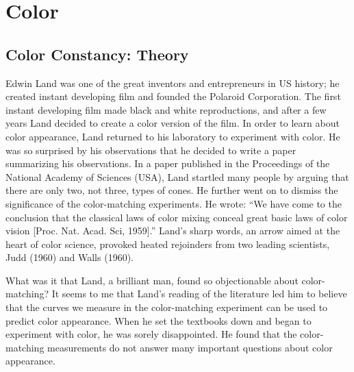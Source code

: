 \chapter{Color}
\label{chapter:Color}

\section{Color Constancy:  Theory}
Edwin Land  was one of the great inventors and entrepreneurs in US history;
he created instant developing film and founded the Polaroid Corporation.
The first instant developing film made black and white
reproductions, and after a few years Land decided to create a color
version of the film.  In order to learn about color appearance, Land
returned to his laboratory to experiment with color.  He
was so surprised by his observations that he decided to write a paper
summarizing his observations.  In a paper published in the Proceedings of the
National Academy of Sciences (USA), Land startled many people by
arguing that there are only two, not three, types of cones.  He
further went on to dismiss the significance of the color-matching
experiments.  He wrote: ``We have come to the conclusion that the
classical laws of color mixing conceal great basic laws of color
vision [Proc. Nat. Acad. Sci, 1959].''  Land's sharp words, an arrow
aimed at the heart of color science, provoked heated rejoinders from
two leading scientists, Judd (1960) and Walls (1960).

What was it that Land, a brilliant man, found so objectionable about
color-matching?  It seems to me that Land's reading of the literature
led him to believe that the curves we measure in the color-matching
experiment can be used to predict color appearance.  When he set the
textbooks down and began to experiment with color, he was sorely
disappointed.  He found that the color-matching measurements do not
answer many important questions about color appearance.


